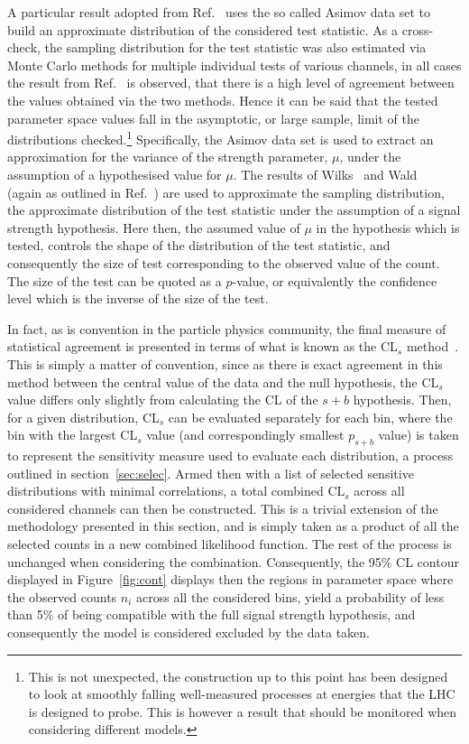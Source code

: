 \documentclass[floatfix]{article}
\begin{document}
A particular result adopted from Ref.~\cite{Cowan:2010js} uses the so called Asimov data set to build an approximate distribution of the considered test statistic. 
As a cross-check, the sampling distribution for the test statistic was also estimated via Monte Carlo methods for multiple individual tests of various channels, 
in all cases the result from Ref.~\cite{Cowan:2010js} is observed, that there is a high level of agreement between the values obtained via the two methods. Hence it can be said
that the tested parameter space values fall in the asymptotic, or large sample, limit of the distributions checked.\footnote{This is not unexpected, the construction up to this point has been designed to look at smoothly falling well-measured processes at energies that the LHC is designed to probe. This is however a result that should be monitored when considering different models.} Specifically, the Asimov data set is used to extract an approximation for the variance of the strength parameter, $\mu$, under the assumption of a hypothesised value for $\mu$. The results of Wilks~\cite{Wilks:1938dza} and Wald~\cite{Wald:1943:EWM} (again as outlined in Ref.~\cite{Cowan:2010js}) 
are used to approximate the sampling distribution, the approximate distribution of the test statistic under the assumption of a signal strength hypothesis. Here then, the assumed value of $\mu$ in the hypothesis which is tested, controls the shape of the distribution of the test statistic, and consequently the size of test corresponding to the observed value of the count. The size of the test can be quoted as a $p$-value, or equivalently the confidence level which is the inverse of the size of the test. 


In fact, as is convention in the particle physics community, the final measure of statistical agreement is presented in terms of what is known as the CL$_{s}$ 
method~\cite{Junk:1999kv,Read:2002hq}. This is simply a matter of convention, since as there is exact agreement in this method between the central value of the 
data and the null hypothesis, the CL$_{s}$ value differs only slightly from calculating the CL of the $s+b$ hypothesis. Then, for a given distribution, CL$_{s}$ 
can be evaluated separately for each bin, where the bin with the largest CL$_{s}$ value (and correspondingly smallest $p_{s+b}$ value) is taken to represent the 
sensitivity measure used to evaluate each distribution, a process outlined in section~\ref{sec:selec}. Armed then with a list of selected sensitive 
distributions with minimal correlations, a total combined CL$_{s}$ across all considered channels can then be constructed. This is a trivial extension of 
the methodology presented in this section, and is simply taken as a product of all the selected counts in a new combined likelihood function. 
The rest of the process is unchanged when considering the combination. Consequently, the 95\% CL contour displayed in Figure~\ref{fig:cont} displays then the regions in parameter space where the observed counts $n_{i}$ across all the considered bins, yield a probability of less than 5\% of being compatible with the full signal strength hypothesis, and consequently the model is considered excluded by the data taken.
\end{document}
